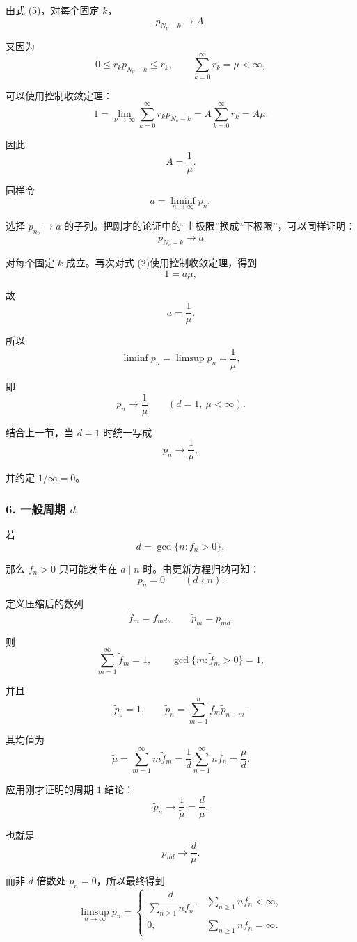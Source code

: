 \documentclass[11pt,a4paper]{ctexart}
\begin{document}
由式 (5)，对每个固定 $k$，
\[
p_{N_\nu-k}\longrightarrow A.
\]

又因为
\[
0\le r_kp_{N_\nu-k}\le r_k,
\qquad
\sum_{k=0}^{\infty}r_k=\mu<\infty,
\]

可以使用控制收敛定理：
\[
1
=\lim_{\nu\to\infty}
\sum_{k=0}^{\infty}r_kp_{N_\nu-k}
=
A\sum_{k=0}^{\infty}r_k
=A\mu.
\]

因此
\begin{equation}\tag{6}
A=\frac1\mu.
\end{equation}

同样令
\[
a=\liminf_{n\to\infty}p_n,
\]

选择 $p_{n_\nu}\to a$ 的子列。把刚才的论证中的“上极限”换成“下极限”，可以同样证明：
\[
p_{N_\nu-k}\to a
\]

对每个固定 $k$ 成立。再次对式 (2)使用控制收敛定理，得到
\[
1=a\mu,
\]

故
\[
a=\frac1\mu.
\]

所以
\[
\liminf p_n=\limsup p_n=\frac1\mu,
\]

即
\[
\boxed{p_n\longrightarrow\frac1\mu}
\qquad(d=1,\ \mu<\infty).
\]

结合上一节，当 $d=1$ 时统一写成
\[
\boxed{p_n\longrightarrow\frac1\mu},
\]

并约定 $1/\infty=0$。

\subsubsection*{6. 一般周期 $d$}

若
\[
d=\gcd\{n:f_n>0\},
\]

那么 $f_n>0$ 只可能发生在 $d\mid n$ 时。由更新方程归纳可知：
\[
p_n=0\qquad(d\nmid n).
\]

定义压缩后的数列
\[
\widetilde f_m=f_{md},
\qquad
\widetilde p_m=p_{md}.
\]

则
\[
\sum_{m=1}^{\infty}\widetilde f_m=1,
\qquad
\gcd\{m:\widetilde f_m>0\}=1,
\]

并且
\[
\widetilde p_0=1,\qquad
\widetilde p_n
=\sum_{m=1}^n\widetilde f_m\widetilde p_{n-m}.
\]

其均值为
\[
\widetilde\mu
=\sum_{m=1}^{\infty}m\widetilde f_m
=\frac1d\sum_{n=1}^{\infty}nf_n
=\frac\mu d.
\]

应用刚才证明的周期 $1$ 结论：
\[
\widetilde p_n
\longrightarrow
\frac1{\widetilde\mu}
=\frac d\mu.
\]

也就是
\[
\boxed{p_{nd}\longrightarrow\frac d\mu}.
\]

而非 $d$ 倍数处 $p_n=0$，所以最终得到
\[
\boxed{
\limsup_{n\to\infty}p_n=
\begin{cases}
\dfrac d{\sum_{n\ge1}nf_n},
&\sum_{n\ge1}nf_n<\infty,\\[8pt]
0,
&\sum_{n\ge1}nf_n=\infty.
\end{cases}}
\]
\end{document}
